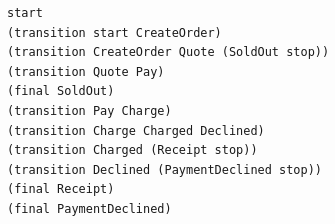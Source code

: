 \begin{lstlisting}[language={},basicstyle=\ttfamily\footnotesize,breaklines=true]
start
(transition start CreateOrder)
(transition CreateOrder Quote (SoldOut stop))
(transition Quote Pay)
(final SoldOut)
(transition Pay Charge)
(transition Charge Charged Declined)
(transition Charged (Receipt stop))
(transition Declined (PaymentDeclined stop))
(final Receipt)
(final PaymentDeclined)
\end{lstlisting}
